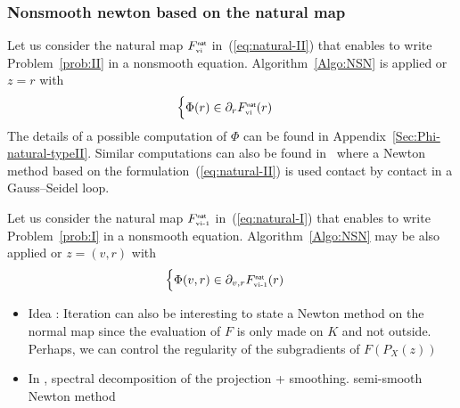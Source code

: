 \subsubsection{Nonsmooth newton based on the natural map }
Let us consider the natural map $F_{{\hbox{\tiny{vi}}}}^{\hbox{\sf \tiny{nat}}}$ in~(\ref{eq:natural-II}) that enables to write Problem~\ref{prob:II} in a nonsmooth equation. Algorithm~\ref{Algo:NSN} is applied or $z =r$ with
\begin{equation}
  \label{eq:phiphi}
  \begin{cases}
    \Phi(r) \in \partial_{r} F_{\vitwo}^\nat(r)
  \end{cases}
\end{equation}
 The details of a possible computation of $\Phi$ can be found in Appendix~\ref{Sec:Phi-natural-typeII}.  Similar computations can also be found in~\cite{Joli.Feng2008} where a Newton method based on the formulation~(\ref{eq:natural-II}) is used contact by contact in a Gauss--Seidel loop.

Let us consider the natural map $F_{{\hbox{\tiny{vi-1}}}}^{\hbox{\sf \tiny{nat}}}$ in~(\ref{eq:natural-I}) that enables to write Problem~\ref{prob:I} in a nonsmooth equation.  Algorithm~\ref{Algo:NSN} may be also applied or $z =(v,r)$ with
\begin{equation}
  \label{eq:phiphi_bis}
  \begin{cases}
    \Phi(v,r) \in \partial_{v,r} F_{\vione}^\nat(r)
  \end{cases}
\end{equation}

\begin{ndrva}
  \begin{itemize}
    \item  Idea : Iteration can also be interesting to state a Newton method
    on the normal map since the evaluation of $F$ is only made on $K$
    and not outside. Perhaps, we can control the regularity of the
    subgradients of $F(P_X(z))$
    \item In \cite{Hayashi.ea_SIOPT2005}, spectral decomposition of the projection + smoothing.  semi-smooth Newton method
  \end{itemize}
\end{ndrva}

